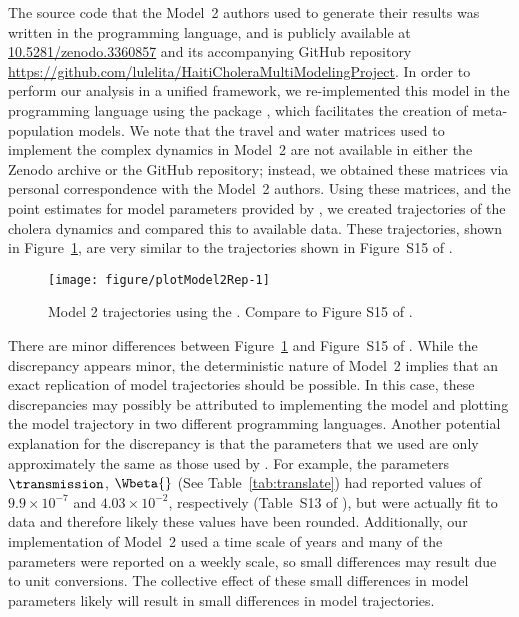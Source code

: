 The source code that the Model~2 authors used to generate their results was written in the  programming language, and is publicly available at \url{10.5281/zenodo.3360857} and its accompanying GitHub repository \url{https://github.com/lulelita/HaitiCholeraMultiModelingProject}.
In order to perform our analysis in a unified framework, we re-implemented this model in the  programming language using the  package \citep{asfaw23arxiv}, which facilitates the creation of meta-population models.
We note that the travel and water matrices used to implement the complex dynamics in Model~2 \citep{lee20sup} are not available in either the Zenodo archive or the GitHub repository;
instead, we obtained these matrices via personal correspondence with the Model~2 authors.
Using these matrices, and the point estimates for model parameters provided by \citep{lee20sup}, we created trajectories of the cholera dynamics and compared this to available data.
These trajectories, shown in Figure~\ref{fig:mod2rep}, are very similar to the trajectories shown in Figure~S15 of \cite{lee20sup}.




\begin{figure}[!h]
\begin{knitrout}
\color{fgcolor}

{\centering \texttt{[image: figure/plotModel2Rep-1]} 

}


\end{knitrout}
\caption{\label{fig:mod2rep}
Model 2 trajectories using the . Compare to Figure S15 of \cite{lee20sup}.
}
\end{figure}

There are minor differences between Figure~\ref{fig:mod2rep} and Figure~S15 of \cite{lee20sup}.
While the discrepancy appears minor, the deterministic nature of Model~2 implies that an exact replication of model trajectories should be possible.
In this case, these discrepancies may possibly be attributed to implementing the model and plotting the model trajectory in two different programming languages.
Another potential explanation for the discrepancy is that the parameters that we used are only approximately the same as those used by \citet{lee20sup}.
For example, the parameters $\transmission$, $\Wbeta{}$ (See Table~\ref{tab:translate}) had reported values of $9.9 \times 10^{-7}$ and $4.03 \times 10^{-2}$, respectively (Table~S13 of \cite{lee20sup}), but were actually fit to data and therefore likely these values have been rounded.
Additionally, our implementation of Model~2 used a time scale of years and many of the parameters were reported on a weekly scale, so small differences may result due to unit conversions.
The collective effect of these small differences in model parameters likely will result in small differences in model trajectories.

